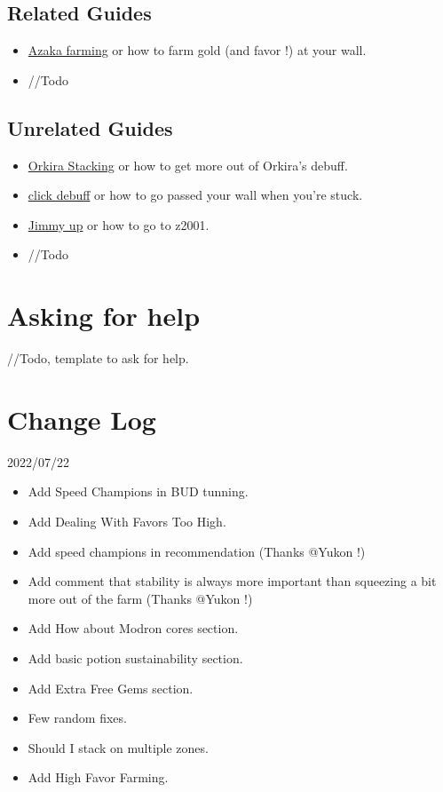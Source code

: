 \documentclass{article}
\begin{document}
\subsection{Related Guides}
\begin{itemize}
\item \href{https://docs.google.com/document/d/1TT5g3BjKDreYQ3MutCRgeSRGYD8a7GrFfZ96bIllT7o/edit?usp=sharing}{Azaka farming} or how to farm gold (and favor !) at your wall.
\item //Todo
\end{itemize}

\subsection{Unrelated Guides}

\begin{itemize}
\item \href{https://docs.google.com/document/d/1ZShfdd9h9hz15fAWaUrlEDUt8xRCrHKAM_ec07FKPVw/edit#}{Orkira Stacking} or how to get more out of Orkira's debuff.
\item \href{https://docs.google.com/document/d/1V9TPb8pxLRTs9NXbHEugz82syt5f-SYTPHTuGDYyxRE/edit}{click debuff} or how to go passed your wall when you're stuck.
\item \href{https://www.reddit.com/r/idlechampions/comments/w60vqa/afk_jimothy_with_the_great_wall_of_selise/}{Jimmy up} or how to go to z2001.

\item //Todo
\end{itemize}


\section{Asking for help}
//Todo, template to ask for help.



\section{Change Log}

2022/07/22 
\begin{itemize}
    \item Add Speed Champions in BUD tunning.
    \item Add Dealing With Favors Too High.
    \item Add speed champions in recommendation (Thanks @Yukon !)
    \item Add comment that stability is always more important than squeezing a bit more out of the farm (Thanks @Yukon !)
    \item Add How about Modron cores section.
    \item Add basic potion sustainability section.
    \item Add Extra Free Gems section.
    \item Few random fixes.
    \item Should I stack on multiple zones.
    \item Add High Favor Farming.
\end{itemize}
\end{document}
